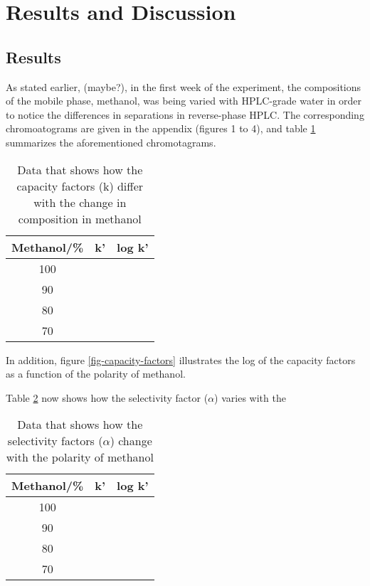 \documentclass[a4paper, 12pt]{article}
\begin{document}

\section{Results and Discussion}

\subsection{Results}
As stated earlier, (maybe?), in the first week of the experiment, the compositions of the mobile phase, methanol, was being varied with HPLC-grade water in order to notice the differences in separations in reverse-phase HPLC. The corresponding chromoatograms are given in the appendix (figures 1 to 4), and table \ref{tab-capacity-factors} summarizes the aforementioned chromotagrams.

\begin{table}[h!]
	\centering
	\begin{tabular}{|c|c|c|}
		\hline
		Methanol/\% & k' & log k' \\
		\hline
		100 & & \\
		\hline
		90 & & \\
		\hline
		80 & & \\
		\hline
		70 & & \\
		\hline
	\end{tabular}
	\caption{Data that shows how the capacity factors (k) differ with the change in composition in methanol}
	\label{tab-capacity-factors}
\end{table}

In addition, figure \ref{fig-capacity-factors} illustrates the log of the capacity factors as a function of the polarity of methanol.

Table \ref{tab-selectivity} now shows how the selectivity factor ($\alpha$) varies with the 

\begin{table}[h!]
	\centering
	\begin{tabular}{|c|c|c|}
		\hline
		Methanol/\% & k' & log k' \\
		\hline
		100 & & \\
		\hline
		90 & & \\
		\hline
		80 & & \\
		\hline
		70 & & \\
		\hline
	\end{tabular}
	\caption{Data that shows how the selectivity factors ($\alpha$) change with the polarity of methanol}
	\label{tab-selectivity}
\end{table}
\end{document}
